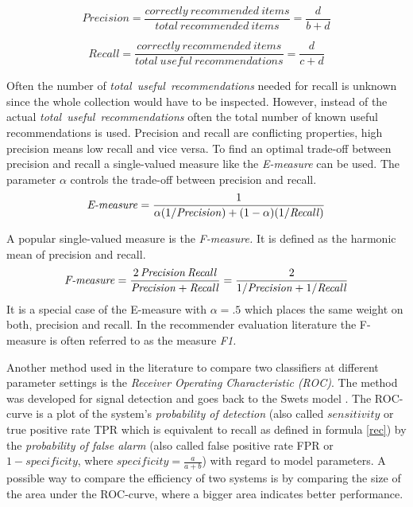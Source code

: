 \documentclass[nojss]{jss}
\begin{document}
\begin{equation}
\mathit{Precision} = \frac{\mathit{correctly\ recommended\ items}}{\mathit{total\ recommended\ items}}
= \frac{d}{b+d}
\label{prec}
\end{equation}

\begin{equation}
\mathit{Recall} = \frac{\mathit{correctly\ recommended\ items}}{\mathit{total\ useful\ recommendations}}
= \frac{d}{c+d}
\label{rec}
\end{equation}


Often the number of {\em total\ useful\ recommendations} needed for recall is
unknown since the whole collection would have to be inspected. However, instead
of the actual {\em total\ useful\ recommendations} often the total number of
known useful recommendations is used.  Precision and recall are
conflicting properties, high precision means low recall and vice versa. To find
an optimal trade-off between precision and recall a single-valued measure like
the {\em E-measure} \citep{recommender:Rijsbergen:1979} can be used.
The parameter $\alpha$ controls the
trade-off between precision and recall.
\begin{equation}
\mbox{\textit{E-measure}} = \frac{1}{\alpha(1/\mathit{Precision}) + (1-\alpha)(1/\mathit{Recall})}
\label{e-measure}
\end{equation}

A popular single-valued measure is the {\em F-measure.} It is defined as the
harmonic mean of precision and recall.
\begin{equation}
\mbox{\textit{F-measure}} = \frac{2\, \mathit{Precision}\, \mathit{Recall}}{\mathit{Precision} + \mathit{Recall}} =
\frac{2}{1/\mathit{Precision} + 1/\mathit{Recall}}
\label{f-measure}
\end{equation}
It is
a special case of the E-measure with $\alpha=.5$ which places the same weight
on both, precision and recall.  In the recommender evaluation literature the
F-measure is often referred to as the measure {\em F1.}

Another method used in the literature to compare two classifiers at different
parameter settings is the {\em Receiver Operating Characteristic (ROC)}.
The method was developed for signal detection and goes back to the Swets model
\citep{recommender:Rijsbergen:1979}. The ROC-curve is a plot of the system's
{\em probability of detection} (also called $\mathit{sensitivity}$ or true
positive rate TPR which is equivalent to recall as defined in
formula \ref{rec}) by the {\em probability of false alarm}
(also called false positive rate FPR or
$1-\mathit{specificity}$, where
$\mathit{specificity} = \frac{a}{a+b}$) with
regard to model parameters.  A possible way to compare the efficiency of two
systems is by comparing the size of the area under the ROC-curve, where a
bigger area indicates better performance.
\end{document}
